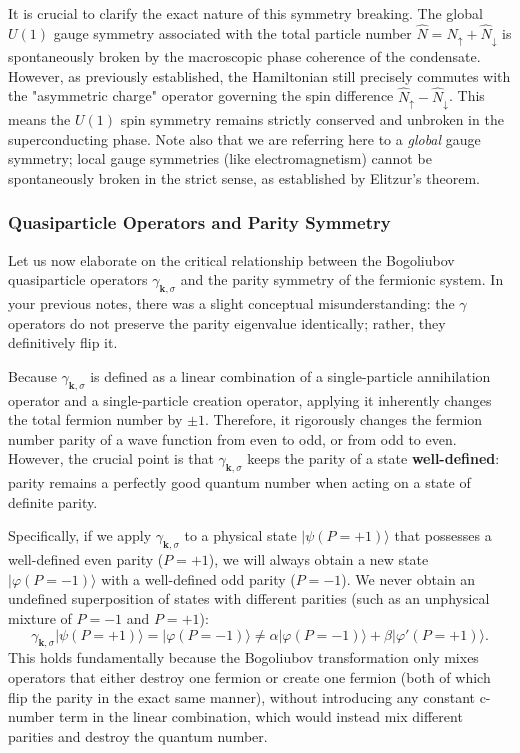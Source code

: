 \begin{remark}
    It is crucial to clarify the exact nature of this symmetry breaking. The global \( U(1) \) gauge symmetry associated with the total particle number \( \hat{N} = \hat{N}_{\uparrow} + \hat{N}_{\downarrow} \) is spontaneously broken by the macroscopic phase coherence of the condensate. However, as previously established, the Hamiltonian still precisely commutes with the "asymmetric charge" operator governing the spin difference \( \hat{N}_{\uparrow} - \hat{N}_{\downarrow} \). This means the \( U(1) \) spin symmetry remains strictly conserved and unbroken in the superconducting phase. Note also that we are referring here to a \textit{global} gauge symmetry; local gauge symmetries (like electromagnetism) cannot be spontaneously broken in the strict sense, as established by Elitzur's theorem.
\end{remark}

\subsubsection{Quasiparticle Operators and Parity Symmetry}

Let us now elaborate on the critical relationship between the Bogoliubov quasiparticle operators \( \gamma_{\mathbf{k},\sigma} \) and the parity symmetry of the fermionic system. In your previous notes, there was a slight conceptual misunderstanding: the \( \gamma \) operators do not preserve the parity eigenvalue identically; rather, they definitively flip it.

Because \( \gamma_{\mathbf{k},\sigma} \) is defined as a linear combination of a single-particle annihilation operator and a single-particle creation operator, applying it inherently changes the total fermion number by \( \pm 1 \). Therefore, it rigorously changes the fermion number parity of a wave function from even to odd, or from odd to even. However, the crucial point is that \( \gamma_{\mathbf{k},\sigma} \) keeps the parity of a state \textbf{well-defined}: parity remains a perfectly good quantum number when acting on a state of definite parity.

Specifically, if we apply \( \gamma_{\mathbf{k},\sigma} \) to a physical state \( |\psi(P = +1)\rangle \) that possesses a well-defined even parity (\( P = +1 \)), we will always obtain a new state \( |\varphi(P = -1)\rangle \) with a well-defined odd parity (\( P = -1 \)). We never obtain an undefined superposition of states with different parities (such as an unphysical mixture of \( P = -1 \) and \( P = +1 \)):
\[
    \gamma_{\mathbf{k},\sigma} |\psi(P = +1)\rangle = |\varphi(P = -1)\rangle \neq \alpha|\varphi(P = -1)\rangle + \beta|\varphi'(P = +1)\rangle.
\]
This holds fundamentally because the Bogoliubov transformation only mixes operators that either destroy one fermion or create one fermion (both of which flip the parity in the exact same manner), without introducing any constant c-number term in the linear combination, which would instead mix different parities and destroy the quantum number.

